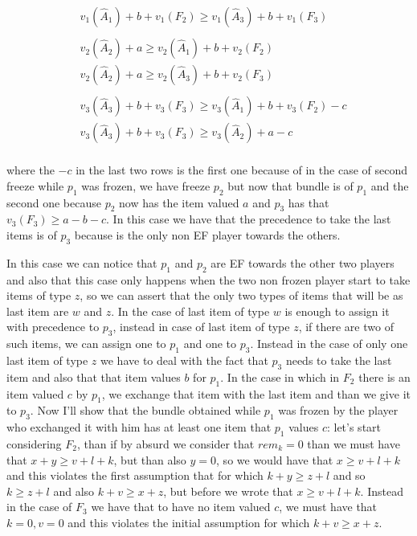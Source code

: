 \begin{itemize}
\begin{align*}
    &v_1(\hat A_1) + b + v_1(F_2) \ge v_1(\hat A_3) + b + v_1(F_3)\\
    \\
    &v_2(\hat A_2) + a \ge v_2(\hat A_1) + b + v_2(F_2) \\
    &v_2(\hat A_2) + a \ge v_2(\hat A_3) + b + v_2(F_3)\\
    \\
    &v_3(\hat A_3) + b + v_3(F_3) \ge v_3(\hat A_1) + b + v_3(F_2) - c\\
    &v_3(\hat A_3) + b + v_3(F_3) \ge v_3(\hat A_2) + a - c\\
\end{align*}

where the $-c$ in the last two rows is the first one because of in the case of second freeze while $p_1$ was frozen, we have freeze $p_2$ but now that bundle is of $p_1$ and the second one because $p_2$ now has the item valued $a$ and $p_3$ has that $v_3(F_3) \ge a - b - c$. In this case we have that the precedence to take the last items is of $p_3$ because is the only non EF player towards the others. 

In this case we can notice that $p_1$ and $p_2$ are EF towards the other two players and also that this case only happens when the two non frozen player start to take items of type $z$, so we can assert that the only two types of items that will be as last item are $w$ and $z$. In the case of last item of type $w$ is enough to assign it with precedence to $p_3$, instead in case of last item of type $z$, if there are two of such items, we can assign one to $p_1$ and one to $p_3$. Instead in the case of only one last item of type $z$ we have to deal with the fact that $p_3$ needs to take the last item and also that that item values $b$ for $p_1$. In the case in which in $F_2$ there is an item valued $c$ by $p_1$, we exchange that item with the last item and than we give it to $p_3$. Now I'll show that the bundle obtained while $p_1$ was frozen by the player who exchanged it with him has at least one item that $p_1$ values $c$: let's start considering $F_2$, than if by absurd we consider that $rem_k = 0$ than we must have that $x + y \ge v + l + k$, but than also $y = 0$, so we would have that $x \ge v + l + k$ and this violates the first assumption that for which $k + y \ge z + l$ and so $k \ge z + l$ and also $k + v \ge x + z$, but before we wrote that $x \ge v + l + k$. Instead in the case of $F_3$ we have that to have no item valued $c$, we must have that $k = 0, v = 0$ and this violates the initial assumption for which $k + v \ge x + z$.
\end{itemize}




